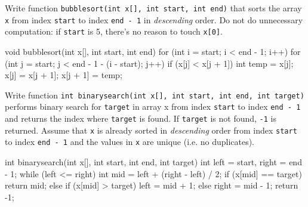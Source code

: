 

\nextq
Write function \verb!bubblesort(int x[], int start, int end)!
that sorts the array \verb!x! from index \verb!start! to index \verb!end - 1!
in \textit{descending} order.
Do not do unnecessary computation: if \verb!start! is 5, there's no
reason to touch \verb!x[0]!.
\\
\ANSWER
\begin{answercode}
  void bubblesort(int x[], int start, int end)
  {
    for (int i = start; i < end - 1; i++)
    {
      for (int j = start; j < end - 1 - (i - start); j++)
      {
        if (x[j] < x[j + 1])
        {
          int temp = x[j];
          x[j] = x[j + 1];
          x[j + 1] = temp;
        }
      }
    }
  }
\end{answercode}

\nextq
Write function \verb!int binarysearch(int x[], int start, int end, int target)!
performs binary search for \verb!target! in array x
from index \verb!start! to index \verb!end - 1! and
returns the index where \verb!target! is found.
If \verb!target! is not found, \verb!-1! is returned.
Assume that \verb!x! is already sorted in \textit{descending} order
from index \verb!start! to index \verb!end - 1!
and the values in \verb!x! are unique (i.e. no duplicates).
\\
\ANSWER
\begin{answercode}
int binarysearch(int x[], int start, int end, int target)
{
    int left = start, right = end - 1;
    while (left <= right)
    {
        int mid = left + (right - left) / 2;
        if (x[mid] == target) return mid;
        else if (x[mid] > target) left = mid + 1;
        else right = mid - 1;
    }
    return -1;
}
\end{answercode}



